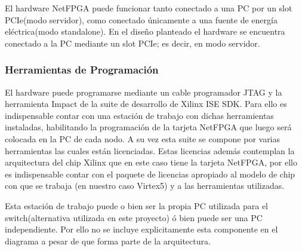 El hardware NetFPGA puede funcionar tanto conectado a una PC por un slot PCIe(modo servidor), como conectado \'unicamente a una fuente de energ\'ia el\'ectrica(modo standalone). En el dise\~no planteado el hardware se encuentra conectado a la PC mediante un slot PCIe; es decir, en modo servidor.


\subsubsection{Herramientas de Programaci\'on}

El hardware puede programarse mediante un cable programador JTAG y la herramienta Impact de la suite de desarrollo de Xilinx ISE SDK. Para ello es indispensable contar con una estaci\'on de trabajo con dichas herramientas instaladas, habilitando la programaci\'on  de la tarjeta NetFPGA que luego ser\'a colocada en la PC de cada nodo. A su vez esta suite se compone por varias herramientas las cuales están licenciadas. Estas licencias adem\'as contemplan la arquitectura del chip Xilinx que en este caso tiene la tarjeta NetFPGA, por ello es indispensable contar con el paquete de licencias apropiado al modelo de chip con que se trabaja (en nuestro caso Virtex5) y a las herramientas utilizadas. 

Esta estaci\'on de trabajo puede o bien ser la propia PC utilizada para el switch(alternativa utilizada en este proyecto) \'o bien puede ser una PC independiente. Por ello no se incluye explicitamente esta componente en el diagrama a pesar de que forma parte de la arquitectura.


